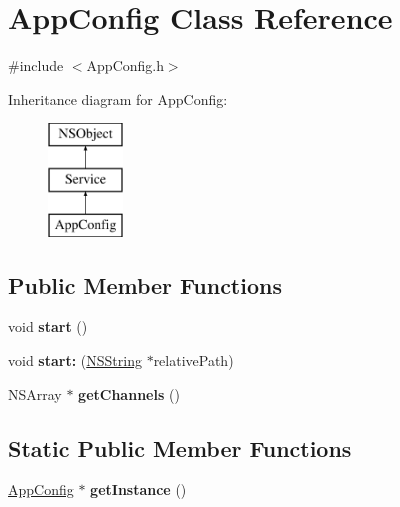 \hypertarget{interface_app_config}{
\section{\-App\-Config \-Class \-Reference}
\label{interface_app_config}
}


{\ttfamily \#include $<$\-App\-Config.\-h$>$}

\-Inheritance diagram for \-App\-Config\-:\begin{figure}[H]
\begin{center}
\leavevmode
\includegraphics[height=3.000000cm]{interface_app_config}
\end{center}
\end{figure}
\subsection*{\-Public \-Member \-Functions}
\begin{DoxyCompactItemize}
\item 
\hypertarget{interface_app_config_a6133c30ff8712d47169a695cf5e509a0}{
void {\bfseries start} ()}
\label{interface_app_config_a6133c30ff8712d47169a695cf5e509a0}

\item 
\hypertarget{interface_app_config_adbd953903d20a0d5f54977be77772e42}{
void {\bfseries start\-:} (\hyperlink{class_n_s_string}{\-N\-S\-String} $\ast$relative\-Path)}
\label{interface_app_config_adbd953903d20a0d5f54977be77772e42}

\item 
\hypertarget{interface_app_config_a27b62438dca30dbb38905218c5bda8bc}{
\-N\-S\-Array $\ast$ {\bfseries get\-Channels} ()}
\label{interface_app_config_a27b62438dca30dbb38905218c5bda8bc}

\end{DoxyCompactItemize}
\subsection*{\-Static \-Public \-Member \-Functions}
\begin{DoxyCompactItemize}
\item 
\hypertarget{interface_app_config_a4f4dd8d26f64776452acf054a6d379ed}{
\hyperlink{interface_app_config}{\-App\-Config} $\ast$ {\bfseries get\-Instance} ()}
\label{interface_app_config_a4f4dd8d26f64776452acf054a6d379ed}

\end{DoxyCompactItemize}

